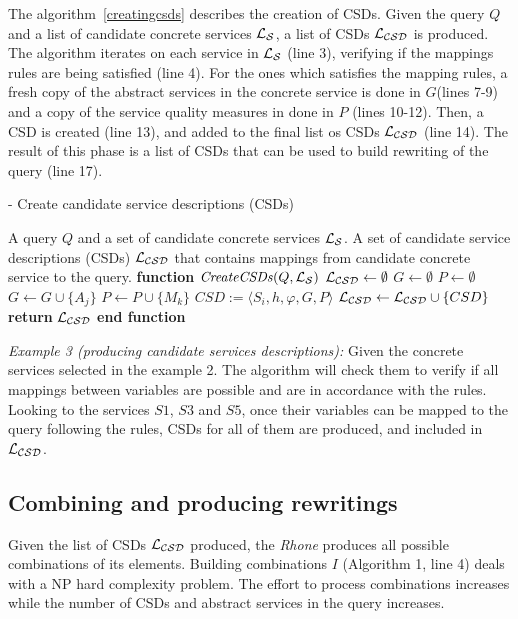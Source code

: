 The algorithm~\ref{creatingcsds} describes the creation of CSDs. Given the query $Q$ and a list of candidate concrete services $\hbox{${\cal L_{S}}$}$, a list of CSDs $\hbox{${\cal L_{CSD}}$}$ is produced. 
The algorithm iterates on each service in $\hbox{${\cal L_{S}}$}$ (line 3), verifying if the mappings rules are being satisfied (line 4). For the ones which satisfies the mapping rules, a fresh copy of the abstract services in the concrete service is done in $G$(lines 7-9) and a copy of the service quality measures in done in $P$ (lines 10-12). Then,
a CSD is created (line 13), and added to the final list os CSDs $\hbox{${\cal L_{CSD}}$}$ (line 14).
The result of this phase is a list of CSDs that can be used to build rewriting of the query (line 17).

\begin{algorithm}
\caption{ - Create candidate service descriptions (CSDs)}
\label{creatingcsds}
\begin{algorithmic}[1]
\REQUIRE A query $Q$ and a set of candidate concrete services $\hbox{${\cal L_{S}}$}$.
\ENSURE A set of candidate service descriptions (CSDs) $\hbox{${\cal L_{CSD}}$}$ that contains mappings from candidate concrete service to the query.
\STATE \textbf{function} $\mathit{CreateCSDs} (Q, \hbox{${\cal L_{S}}$})$
\STATE $\hbox{${\cal L_{CSD}}$} \leftarrow \emptyset$
		\STATE $G \leftarrow \emptyset$	
		\STATE $P \leftarrow \emptyset$		
			\STATE $G \leftarrow G \cup \lbrace A_{j} \rbrace$ 
		\ENDFOR
			\STATE $P \leftarrow P \cup \lbrace M_{k} \rbrace$ 
		\ENDFOR
		\STATE $CSD := \langle S_{i}, h, \varphi, G, P \rangle$	
		\STATE $\hbox{${\cal L_{CSD}}$} \leftarrow \hbox{${\cal L_{CSD}}$} \cup \lbrace CSD \rbrace$	
	\ENDIF
\ENDFOR
\STATE \textbf{return} $\hbox{${\cal L_{CSD}}$}$
\STATE \textbf{end function}
\end{algorithmic}
\end{algorithm}

\bigskip
\noindent \textit{Example 3 (producing candidate services descriptions):} 
Given the concrete services selected in the example 2. The algorithm will check them to 
verify if all mappings between variables are possible and are in accordance with the rules. 
Looking to the services $S1$, $S3$ and $S5$, once their variables can be mapped to the
query following the rules, CSDs for all of them are produced, and included in $\hbox{${\cal L_{CSD}}$}$.


\subsection{Combining and producing rewritings}
Given the list of CSDs $\hbox{${\cal L_{CSD}}$}$ produced, the \textit{Rhone} produces all possible combinations of its elements. 
Building combinations $I$ (Algorithm 1, line 4) deals with a NP hard complexity problem.
The effort to process combinations increases while the number of CSDs and abstract services in the query increases.

